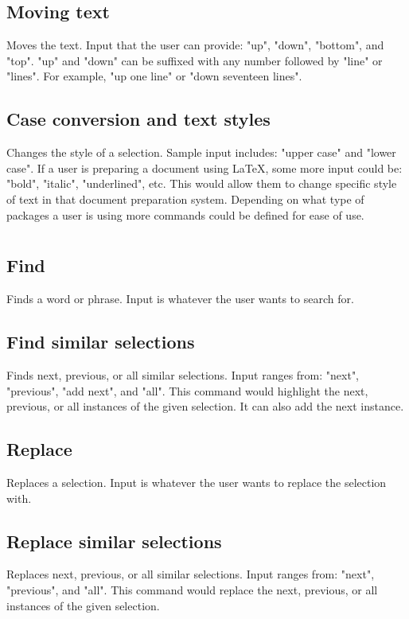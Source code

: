 \documentclass[11pt, oneside]{article}
\begin{document}
	\subsection{Moving text}
	Moves the text. Input that the user can provide: "up", "down", "bottom", and "top". "up" and "down" can be suffixed with any number followed by "line" or "lines". For example, "up one line" or "down seventeen lines".

	\subsection{Case conversion and text styles}
	Changes the style of a selection. Sample input includes: "upper case" and "lower case". If a user is preparing a document using \LaTeX, some more input could be: "bold", "italic", "underlined", etc. This would allow them to change specific style of text in that document preparation system. Depending on what type of packages a user is using more commands could be defined for ease of use.

\section{}

	\subsection{Find}
	Finds a word or phrase. Input is whatever the user wants to search for.

	\subsection{Find similar selections}
	Finds next, previous, or all similar selections. Input ranges from: "next", "previous", "add next", and "all". This command would highlight the next, previous, or all instances of the given selection. It can also add the next instance.

	\subsection{Replace}
	Replaces a selection. Input is whatever the user wants to replace the selection with.

	\subsection{Replace similar selections}
	Replaces next, previous, or all similar selections. Input ranges from: "next", "previous", and "all". This command would replace the next, previous, or all instances of the given selection.
\end{document}
